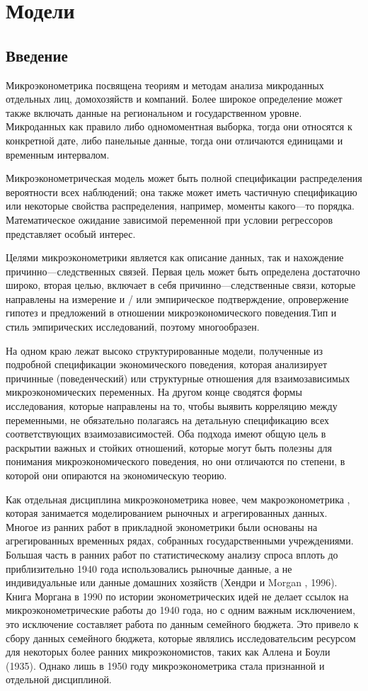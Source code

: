 
\chapter{Модели}

\section{Введение}

	Микроэконометрика посвящена теориям и методам анализа микроданных отдельных лиц, домохозяйств и компаний. Более широкое определение может также включать данные на региональном и государственном уровне. Микроданных как правило либо одномоментная выборка, тогда они относятся к конкретной дате, либо панельные данные, тогда они отличаются единицами и временным интервалом. 
	
	
	Микроэконометрическая модель может быть полной спецификации распределения вероятности всех наблюдений; она также может иметь частичную спецификацию или некоторые свойства распределения, например, моменты какого---то порядка. Математическое ожидание зависимой переменной при условии регрессоров представляет особый интерес. 
	
	
	Целями микроэконометрики является как описание данных, так и нахождение причинно---следственных связей. Первая цель может быть определена достаточно широко, вторая целью, включает в себя причинно---следственные связи, которые направлены на измерение и / или эмпирическое подтверждение, опровержение гипотез и предложений в отношении микроэкономического поведения.Тип и стиль эмпирических исследований, поэтому многообразен. 
	
	
	На одном краю лежат высоко структурированные модели, полученные из подробной спецификации экономического поведения, которая анализирует причинные (поведенческий) или структурные отношения для взаимозависимых микроэкономических переменных. На другом конце сводятся формы исследования, которые направлены на то, чтобы выявить корреляцию между переменными, не обязательно полагаясь на детальную спецификацию всех соответствующих взаимозависимостей. Оба подхода имеют общую цель в раскрытии важных и стойких отношений, которые могут быть полезны для понимания микроэкономического поведения, но они отличаются по степени, в которой они опираются на экономическую теорию. 
	

	Как отдельная дисциплина микроэконометрика новее, чем макроэконометрика , которая занимается моделированием рыночных и агрегированных данных. Многое из ранних работ в прикладной эконометрики были основаны на агрегированных временных рядах, собранных государственными учреждениями. Большая часть в ранних работ по статистическому анализу спроса вплоть до приблизительно 1940 года использовались рыночные данные, а не индивидуальные или данные домашних хозяйств (Хендри и Morgan , 1996). Книга Моргана в 1990 по истории эконометрических идей не делает ссылок на микроэконометрические работы до 1940 года, но с одним важным исключением, это исключение составляет работа по данным семейного бюджета. Это привело к сбору данных семейного бюджета, которые являлись исследовательсим ресурсом для некоторых более ранних микроэкономистов, таких как Аллена и Боули (1935). Однако лишь в 1950 году микроэконометрика стала признанной и отдельной дисциплиной. 
	

